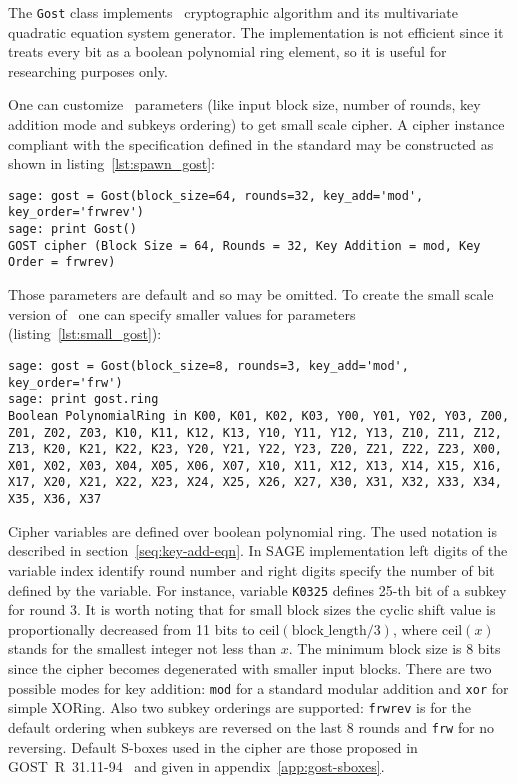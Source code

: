 The \verb+Gost+ class implements \gost\ cryptographic algorithm and its
multivariate quadratic equation system generator. The implementation is not
efficient since it treats every bit as a boolean polynomial ring element, so it
is useful for researching purposes only. 

One can customize \gost\ parameters (like input block size, number of rounds, key
addition mode and subkeys ordering) to get small scale cipher. A cipher instance
compliant with the specification defined in the standard may be constructed as
shown in listing~\ref{lst:spawn_gost}:
\begin{lstlisting}[label=lst:spawn_gost, caption=Creating GOST instance]
sage: gost = Gost(block_size=64, rounds=32, key_add='mod', key_order='frwrev')
sage: print Gost()
GOST cipher (Block Size = 64, Rounds = 32, Key Addition = mod, Key Order = frwrev)
\end{lstlisting}
Those parameters are default and so may be omitted. To create the small scale
version of \gost\ one can specify smaller values for parameters
(listing~\ref{lst:small_gost}):
\begin{lstlisting}[label=lst:small_gost, caption=Small scale GOST]
sage: gost = Gost(block_size=8, rounds=3, key_add='mod', key_order='frw')
sage: print gost.ring
Boolean PolynomialRing in K00, K01, K02, K03, Y00, Y01, Y02, Y03, Z00, Z01, Z02, Z03, K10, K11, K12, K13, Y10, Y11, Y12, Y13, Z10, Z11, Z12, Z13, K20, K21, K22, K23, Y20, Y21, Y22, Y23, Z20, Z21, Z22, Z23, X00, X01, X02, X03, X04, X05, X06, X07, X10, X11, X12, X13, X14, X15, X16, X17, X20, X21, X22, X23, X24, X25, X26, X27, X30, X31, X32, X33, X34, X35, X36, X37
\end{lstlisting}

Cipher variables are defined over boolean polynomial ring. The used notation
is described in section~\ref{seq:key-add-eqn}. In SAGE implementation left digits of the variable index
identify round number and right digits specify the number of bit defined by the
variable. For instance, variable \verb+K0325+ defines 25-th bit of a subkey for round 3. It is
worth noting that for small block sizes the cyclic shift value is
proportionally decreased from 11 bits to 
$\text{ceil}(\text{block\_length} / 3)$,
where $\text{ceil}(x)$ stands for the smallest integer not less than $x$. The
minimum block size is 8 bits since the cipher becomes degenerated with smaller
input blocks.
There are two possible modes for key addition: \verb+mod+ for a standard modular
addition and \verb+xor+ for simple XORing. Also two subkey orderings are
supported: \verb+frwrev+ is for the default ordering when subkeys are reversed on
the last 8 rounds and \verb+frw+ for no reversing. Default S-boxes used in the
cipher are those proposed in GOST~R~31.11-94~\cite{GOST3411} and given in
appendix~\ref{app:gost-sboxes}.

